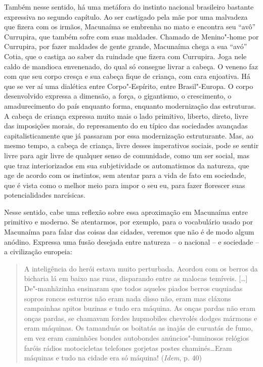 {Também nesse sentido, há uma metáfora do instinto nacional brasileiro
bastante expressiva no segundo capítulo. Ao ser castigado pela mãe por
uma malvadeza que fizera com os irmãos, Macunaíma se embrenha no mato e
encontra seu ``avô'' Currupira, que também sofre com suas maldades.
Chamado de Menino"-home por Currupira, por fazer maldades de gente
grande, Macunaíma chega a sua ``avó'' Cotia, que o castiga ao saber da
ruindade que fizera com Currupira. Joga nele caldo de mandioca
envenenado, do qual só consegue livrar a cabeça. O veneno faz com
que seu corpo cresça e sua cabeça fique de criança, com cara enjoativa.
Há que se ver aí uma dialética entre Corpo"-Espírito, entre
Brasil"-Europa. O corpo desenvolvido expressa a dimensão, a força, o
gigantismo, o crescimento, o amadurecimento do país enquanto forma,
enquanto modernização das estruturas. A cabeça de criança expressa muito
mais o lado primitivo, liberto, direto, livre das imposições morais, do
represamento do eu típico das sociedades avançadas capitalisticamente
que já passaram por essa modernização estruturante. Mas, ao mesmo tempo,
a cabeça de criança, livre desses imperativos sociais, pode se sentir
livre para agir livre de qualquer senso de comunidade, como um ser
social, mas que traz interiorizados em sua subjetividade os automatismos
da natureza, que age de acordo com os instintos, sem atentar para a vida
de fato em sociedade, que é vista como o melhor meio para impor o seu
eu, para fazer florescer suas potencialidades narcísicas.

Nesse sentido, cabe uma reflexão sobre essa aproximação em Macunaíma
entre primitivo e moderno. Se atentarmos, por exemplo, para o
vocabulário usado por Macunaíma para falar das coisas das cidades,
veremos que não é de modo algum anódino. Expressa uma fusão desejada
entre natureza -- o nacional -- e sociedade -- a civilização europeia:

\begin{quote}
A inteligência do herói estava muito perturbada. Acordou com os berros
da bicharia lá em baixo nas ruas, disparando entre as malocas temíveis.
[\ldots{}] De"-manhãzinha ensinaram que todos aqueles piados berros
cuquiadas sopros roncos esturros não eram nada disso não, eram mas
cláxons campainhas apitos buzinas e tudo era máquina. As onças pardas
não eram onças pardas, se chamavam fordes hupmobiles chevrolés dodges
mármons e eram máquinas. Os tamanduás os boitatás as inajás de curuatás
de fumo, em vez eram caminhões bondes autobondes anúncios"-luminosos
relógios faróis rádios motocicletas telefones gorjetas postes
chaminés\ldots{}Eram máquinas e tudo na cidade era só máquina! (\emph{Idem},
p. 40)
\end{quote}

}
